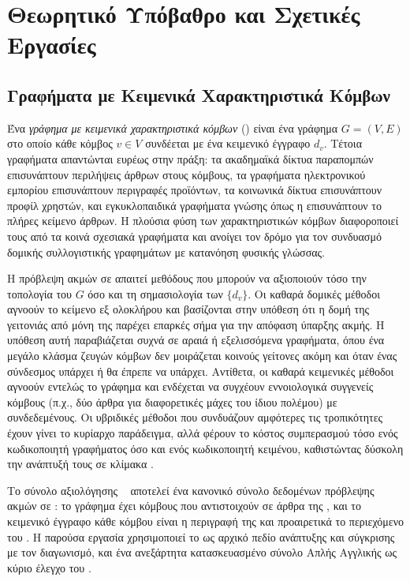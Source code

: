 

\chapter{Θεωρητικό Υπόβαθρο και Σχετικές Εργασίες}
\label{ch:background}


\section{Γραφήματα με Κειμενικά Χαρακτηριστικά Κόμβων}
\label{sec:tag-graphs}

Ένα \textit{γράφημα με κειμενικά χαρακτηριστικά κόμβων} () είναι ένα γράφημα $G = (V, E)$ στο οποίο κάθε κόμβος $v \in V$ συνδέεται με
ένα κειμενικό έγγραφο $d_v$.
Τέτοια γραφήματα απαντώνται ευρέως στην πράξη: τα
ακαδημαϊκά δίκτυα παραπομπών επισυνάπτουν περιλήψεις άρθρων στους κόμβους, τα
γραφήματα ηλεκτρονικού εμπορίου επισυνάπτουν περιγραφές προϊόντων, τα κοινωνικά δίκτυα
επισυνάπτουν προφίλ χρηστών, και εγκυκλοπαιδικά γραφήματα γνώσης όπως η 
επισυνάπτουν το πλήρες κείμενο άρθρων.
Η πλούσια φύση των χαρακτηριστικών κόμβων
διαφοροποιεί τους  από τα κοινά σχεσιακά γραφήματα και ανοίγει τον
δρόμο για τον συνδυασμό δομικής συλλογιστικής γραφημάτων με κατανόηση φυσικής γλώσσας.

Η πρόβλεψη ακμών σε  απαιτεί μεθόδους που μπορούν να αξιοποιούν τόσο την
τοπολογία του $G$ όσο και τη σημασιολογία των $\{d_v\}$.
Οι καθαρά δομικές μέθοδοι
αγνοούν το κείμενο εξ ολοκλήρου και βασίζονται στην υπόθεση ότι η δομή της γειτονιάς
από μόνη της παρέχει επαρκές σήμα για την απόφαση ύπαρξης ακμής.
Η υπόθεση αυτή
παραβιάζεται συχνά σε αραιά ή εξελισσόμενα γραφήματα, όπου ένα μεγάλο κλάσμα
ζευγών κόμβων δεν μοιράζεται κοινούς γείτονες ακόμη και όταν ένας σύνδεσμος υπάρχει
ή θα έπρεπε να υπάρχει.
Αντίθετα, οι καθαρά κειμενικές μέθοδοι αγνοούν εντελώς το
γράφημα και ενδέχεται να συγχέουν εννοιολογικά συγγενείς κόμβους (π.χ., δύο άρθρα για
διαφορετικές μάχες του ίδιου πολέμου) με συνδεδεμένους.
Οι υβριδικές μέθοδοι που
συνδυάζουν αμφότερες τις τροπικότητες έχουν γίνει το κυρίαρχο παράδειγμα, αλλά
φέρουν το κόστος συμπερασμού τόσο ενός κωδικοποιητή γραφήματος όσο και ενός κωδικοποιητή
κειμένου, καθιστώντας δύσκολη την ανάπτυξή τους σε κλίμακα .

Το σύνολο αξιολόγησης ~\cite{phan2023link} αποτελεί ένα
κανονικό σύνολο δεδομένων πρόβλεψης ακμών σε : το γράφημα έχει \GraphNodesTotal{} κόμβους
που αντιστοιχούν σε άρθρα της , και το κειμενικό έγγραφο κάθε κόμβου
είναι η περιγραφή της  και προαιρετικά το περιεχόμενο του .
Η παρούσα εργασία χρησιμοποιεί το  ως αρχικό πεδίο ανάπτυξης και
σύγκρισης με τον διαγωνισμό, και ένα ανεξάρτητα κατασκευασμένο σύνολο Απλής
Αγγλικής  ως κύριο έλεγχο του .


